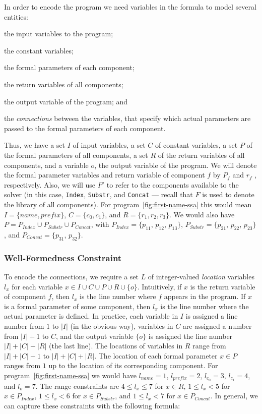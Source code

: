 In order to encode the program we need variables in the formula to model several
entities:
\begin{enumerate*}[(1)]
\item the input variables to the program;
\item the constant variables;
\item the formal parameters of each component;
\item the return variables of all components;
\item the output variable of the program; and
\item the \textit{connections} between the variables, that specify which
  actual parameters are passed to the formal parameters of each component.
\end{enumerate*}
Thus, we have a set $I$ of input variables, a set $C$ of constant variables, a
set $P$ of the formal parameters of all components, a set $R$ of the return
variables of all components, and a variable $o$, the output variable of the
program. We will denote the formal parameter variables and return variable of
component $f$ by $P_f$ and $r_f$ , respectively. Also, we will use $F'$ to refer
to the components available to the solver (in this case, \lstinline{Index},
\lstinline{Substr}, and \lstinline{Concat} --- recall that $F$ is used to denote
the library of all components).
For program~\ref{fig:first-name-ssa} this would mean $I = \{name, prefix\}$,
$C = \{c_0, c_1\}$, and $R = \{r_1, r_2, r_3\}$. We would also have
$P = P_{Index} \cup P_{Substr} \cup P_{Concat}$, with
$P_{Index} = \{p_{11}$, $p_{12}$, $p_{13}\}$,
$P_{Substr} = \{p_{21}$, $p_{22}$, $p_{23}\}$, and
$P_{Concat} = \{p_{31}$, $p_{32}\}$.

\subsubsection{Well-Formedness Constraint}
\label{sec:wfp-constraint}

To encode the connections, we require a set $L$ of integer-valued
\textit{location} variables $l_x$ for each variable $x \in I \cup C \cup P \cup
R \cup \{o\}$. Intuitively, if $x$ is the return variable of component $f$, then
$l_x$ is the line number where $f$ appears in the program. If $x$ is a formal
parameter of some component, then $l_x$ is the line number where the actual
parameter is defined. In practice, each variable in $I$ is assigned a line
number from $1$ to $|I|$ (in the obvious way), variables in $C$ are assigned
a number from $|I| + 1$ to $C$, and the output variable $\{o\}$ is assigned the
line number $|I| + |C| + |R|$ (the last line). The locations of variables in $R$
range from $|I| + |C| + 1$ to $|I| + |C| + |R|$. The location of each formal
parameter $x \in P$ ranges from $1$ up to the location of its corresponding
component.
For program~\ref{fig:first-name-ssa} we would have
$l_{name} = 1$, $l_{prefix} = 2$,
$l_{c_0} = 3$, $l_{c_1} = 4$,
and $l_o = 7$.
The range constraints are
$4 \leq l_x \leq 7$ for $x \in R$,
$1 \leq l_x < 5$ for $x \in P_{Index}$,
$1 \leq l_x < 6$ for $x \in P_{Substr}$, and
$1 \leq l_x < 7$ for $x \in P_{Concat}$.
In general, we can capture these constraints with the following formula:

